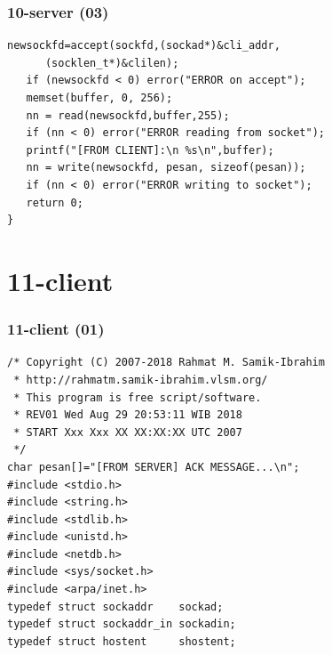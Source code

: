 \documentclass[xcolor=table, notheorems, hyperref={pdfpagelabels=false}]{beamer}
\begin{document}
\begin{frame}[fragile]
\frametitle{10-server (03)}
\begin{lstlisting}[basicstyle=\ttfamily\footnotesize]
   newsockfd=accept(sockfd,(sockad*)&cli_addr,
      (socklen_t*)&clilen);
   if (newsockfd < 0) error("ERROR on accept");
   memset(buffer, 0, 256);
   nn = read(newsockfd,buffer,255);
   if (nn < 0) error("ERROR reading from socket");
   printf("[FROM CLIENT]:\n %s\n",buffer);
   nn = write(newsockfd, pesan, sizeof(pesan));
   if (nn < 0) error("ERROR writing to socket");
   return 0;
}

\end{lstlisting}
\end{frame}

\section{11-client}
\begin{frame}[fragile]
\frametitle{11-client (01)}
\begin{lstlisting}[basicstyle=\ttfamily\small]
/* Copyright (C) 2007-2018 Rahmat M. Samik-Ibrahim
 * http://rahmatm.samik-ibrahim.vlsm.org/
 * This program is free script/software.
 * REV01 Wed Aug 29 20:53:11 WIB 2018
 * START Xxx Xxx XX XX:XX:XX UTC 2007
 */
char pesan[]="[FROM SERVER] ACK MESSAGE...\n";
#include <stdio.h>
#include <string.h>
#include <stdlib.h>
#include <unistd.h>
#include <netdb.h>
#include <sys/socket.h>
#include <arpa/inet.h>
typedef struct sockaddr    sockad;
typedef struct sockaddr_in sockadin;
typedef struct hostent     shostent;

\end{lstlisting}
\end{frame}
\end{document}
